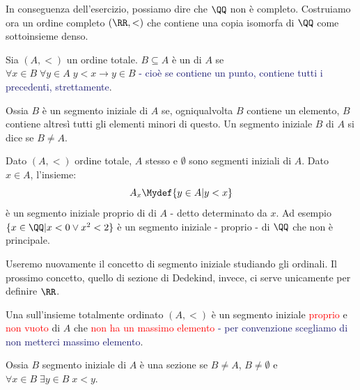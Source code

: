 \begin{soln}
	
\end{soln}

In conseguenza dell'esercizio, possiamo dire che $\QQ$ non è completo. Costruiamo ora un ordine completo $(\RR,<)$ che contiene una copia isomorfa di $\QQ$ come sottoinsieme denso.

\begin{definition}
	Sia $(A,<)$ un ordine totale. $B \subseteq A$ è un  di $A$ se $\forall x \in B \; \forall y \in A \; y < x \rightarrow y \in B$ \textcolor{MidnightBlue}{- cioè se contiene un punto, contiene tutti i precedenti, strettamente}.
\end{definition}

Ossia $B$ è un segmento iniziale di $A$ se, ogniqualvolta $B$ contiene un elemento, $B$ contiene altresì tutti gli elementi minori di questo.
Un segmento iniziale $B$ di $A$ si dice  se $B \ne A$.

\begin{example}
	Dato $(A,<)$ ordine totale, $A$ stesso e $\emptyset$ sono segmenti iniziali di $A$. Dato $x \in A$, l'insieme:
	\[ A_x \Mydef \{y \in A | y < x\}
		\]
	è un segmento iniziale proprio di di $A$ - detto  determinato da $x$. Ad esempio $\{x \in \QQ | x < 0 \lor x^2 < 2\}$
	è un segmento iniziale - proprio - di $\QQ$ che non è principale.
\end{example}

\begin{note}
	Useremo nuovamente il concetto di segmento iniziale studiando gli ordinali. Il prossimo concetto, quello di sezione di Dedekind, invece, ci serve unicamente per definire $\RR$.
\end{note}

\begin{definition}
	Una  sull'insieme totalmente ordinato $(A,<)$ è un segmento iniziale \textcolor{red}{proprio}
	e \textcolor{red}{non vuoto} di $A$ che \textcolor{red}{non ha un massimo elemento} \textcolor{MidnightBlue}{- per convenzione scegliamo di non metterci massimo elemento}.
\end{definition}

Ossia $B$ segmento iniziale di $A$ è una sezione se $B \ne A$, $B \ne \emptyset$ e $\forall x \in B \; \exists y \in B \; x < y$.

